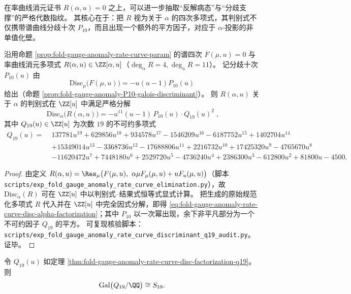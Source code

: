 在率曲线消元证书 \(R(\alpha,u)=0\) 之上，可以进一步抽取“反解病态”与“分歧支撑”的严格代数指纹。
其核心在于：把 \(R\) 视为关于 \(\alpha\) 的四次多项式，其判别式不仅携带谱曲线分歧十次 \(P_{10}\)，而且出现一个额外的平方因子，对应于 \(\alpha\)-投影的非单值化壁。

\begin{theorem}[率曲线消元判别式的分歧分解与同域因子]\label{thm:fold-gauge-anomaly-rate-curve-disc-factorization-q19}
沿用命题 \ref{prop:fold-gauge-anomaly-rate-curve-param} 的谱四次
\(
F(\mu,u)=0
\)
与率曲线消元多项式 \(R(\alpha,u)\in\ZZ[\alpha,u]\)（\(\deg_\alpha R=4,\deg_u R=11\)）。
记分歧十次 \(P_{10}(u)\) 由
\[
\mathrm{Disc}_{\mu}\!\bigl(F(\mu,u)\bigr)=-u(u-1)P_{10}(u)
\]
给出（命题 \ref{prop:fold-gauge-anomaly-P10-galois-discriminant}）。
则 \(R(\alpha,u)\) 关于 \(\alpha\) 的判别式在 \(\ZZ[u]\) 中满足严格分解
\begin{equation}\label{eq:fold-gauge-anomaly-rate-curve-disc-alpha-factorization}
\boxed{\;
\mathrm{Disc}_{\alpha}\!\bigl(R(\alpha,u)\bigr)
=-u^{11}(u-1)\,P_{10}(u)\cdot Q_{19}(u)^{2}\;},
\end{equation}
其中 \(Q_{19}(u)\in\ZZ[u]\) 为次数 \(19\) 的不可约多项式
\[
\begin{aligned}
Q_{19}(u)=\;&137781u^{19}+629856u^{18}+934578u^{17}-1546209u^{16}-6187752u^{15}+1402704u^{14}\\
&+15349014u^{13}-3368736u^{12}-17688806u^{11}+2216732u^{10}+17425320u^9-4765670u^8\\
&-11620472u^7+7448180u^6+2529720u^5-4736240u^4+2386300u^3-612800u^2+81800u-4500.
\end{aligned}
\]
\end{theorem}

\begin{proof}
由定义 \(R(\alpha,u)=\Res_{\mu}\bigl(F(\mu,u),\ \alpha\mu F_{\mu}(\mu,u)+uF_u(\mu,u)\bigr)\)（脚本 \texttt{scripts/exp\_fold\_gauge\_anomaly\_rate\_curve\_elimination.py}），故 \(\mathrm{Disc}_{\alpha}(R)\) 可在 \(\ZZ[u]\) 中以判别式--结果式恒等式显式计算。
把生成的原始规范化多项式 \(R\) 代入并在 \(\ZZ[u]\) 中完全因式分解，即得 \eqref{eq:fold-gauge-anomaly-rate-curve-disc-alpha-factorization}；其中 \(P_{10}\) 以一次幂出现，余下非平凡部分为一个不可约因子 \(Q_{19}\) 的平方。
可复现核验脚本：\texttt{scripts/exp\_fold\_gauge\_anomaly\_rate\_curve\_discriminant\_q19\_audit.py}。证毕。
\end{proof}

\begin{theorem}\label{thm:fold-gauge-anomaly-q19-galois-s19}
令 \(Q_{19}(u)\) 如定理 \ref{thm:fold-gauge-anomaly-rate-curve-disc-factorization-q19}。
则
\[
\mathrm{Gal}\bigl(Q_{19}/\QQ\bigr)\cong S_{19}.
\]
\end{theorem}

